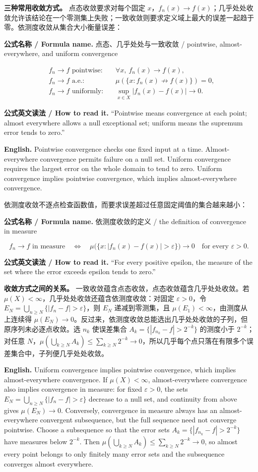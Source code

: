 \documentclass[UTF8,11pt,a4paper]{ctexart}
\newcommand{\EN}[1]{\par\noindent\textbf{English.} #1\par}
\newcommand{\READ}[1]{\par\noindent\textbf{公式英文读法 / How to read it.} #1\par}
\newcommand{\FORMULA}[2]{\par\Needspace{3\baselineskip}\noindent\textbf{公式名称 / Formula name.} #1 / #2\par}
\begin{document}
\noindent\textbf{三种常用收敛方式。} 点态收敛要求对每个固定 $x$，$f_n(x)\to f(x)$；几乎处处收敛允许该结论在一个零测集上失败；一致收敛则要求定义域上最大的误差一起趋于零。依测度收敛从集合大小衡量误差：
\FORMULA{点态、几乎处处与一致收敛}{pointwise, almost-everywhere, and uniform convergence}
\[
\begin{aligned}
&f_n\to f\text{ pointwise}: &&\forall x,\ f_n(x)\to f(x),\\
&f_n\to f\text{ a.e.}: &&\mu(\{x:f_n(x)\not\to f(x)\})=0,\\
&f_n\to f\text{ uniformly}: &&\sup_{x\in X}|f_n(x)-f(x)|\to0.
\end{aligned}
\]
\READ{“Pointwise means convergence at each point; almost everywhere allows a null exceptional set; uniform means the supremum error tends to zero.”}
\EN{Pointwise convergence checks one fixed input at a time. Almost-everywhere convergence permits failure on a null set. Uniform convergence requires the largest error on the whole domain to tend to zero. Uniform convergence implies pointwise convergence, which implies almost-everywhere convergence.}
\noindent 依测度收敛不逐点检查函数值，而要求误差超过任意固定阈值的集合越来越小：
\FORMULA{依测度收敛的定义}{the definition of convergence in measure}
\[
f_n\to f\text{ in measure}
\quad\Longleftrightarrow\quad
\mu\bigl(\{x:|f_n(x)-f(x)|>\varepsilon\}\bigr)\to0
\quad\text{for every }\varepsilon>0.
\]
\READ{“For every positive epsilon, the measure of the set where the error exceeds epsilon tends to zero.”}
\noindent\textbf{收敛方式之间的关系。} 一致收敛蕴含点态收敛，点态收敛蕴含几乎处处收敛。若 $\mu(X)<\infty$，几乎处处收敛还蕴含依测度收敛：对固定 $\varepsilon>0$，令 $E_N=\bigcup_{n\ge N}\{|f_n-f|>\varepsilon\}$，则 $E_N$ 递减到零测集，且 $\mu(E_1)<\infty$，由测度从上连续得 $\mu(E_N)\to0$。反过来，依测度收敛总能选出几乎处处收敛的子列，但原序列未必逐点收敛。选 $n_k$ 使误差集合 $A_k=\{|f_{n_k}-f|>2^{-k}\}$ 的测度小于 $2^{-k}$；对任意 $N$，$\mu(\bigcup_{k\ge N}A_k)\le\sum_{k\ge N}2^{-k}\to0$，所以几乎每个点只落在有限多个误差集合中，子列便几乎处处收敛。
\EN{Uniform convergence implies pointwise convergence, which implies almost-everywhere convergence. If $\mu(X)<\infty$, almost-everywhere convergence also implies convergence in measure: for fixed $\varepsilon>0$, the sets $E_N=\bigcup_{n\ge N}\{|f_n-f|>\varepsilon\}$ decrease to a null set, and continuity from above gives $\mu(E_N)\to0$. Conversely, convergence in measure always has an almost-everywhere convergent subsequence, but the full sequence need not converge pointwise. Choose a subsequence so that the error sets $A_k=\{|f_{n_k}-f|>2^{-k}\}$ have measures below $2^{-k}$. Then $\mu(\bigcup_{k\ge N}A_k)\le\sum_{k\ge N}2^{-k}\to0$, so almost every point belongs to only finitely many error sets and the subsequence converges almost everywhere.}
\end{document}
